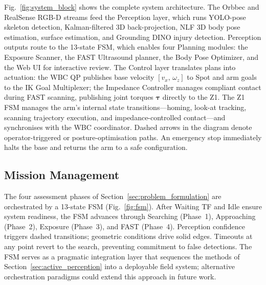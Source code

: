 Fig.~\ref{fig:system_block} shows the complete system architecture. The Orbbec
and RealSense RGB-D streams feed the Perception layer, which runs YOLO-pose
skeleton detection, Kalman-filtered 3D back-projection, NLF 3D body pose
estimation, surface estimation, and Grounding DINO injury detection. Perception
outputs route to the 13-state \ac{FSM}, which enables four Planning modules: the
Exposure Scanner, the \ac{FAST} Ultrasound planner, the Body Pose Optimizer, and
the Web UI for interactive review. The Control layer translates plans into
actuation: the \ac{WBC} \ac{QP} publishes base velocity $[v_x,\,\omega_z]$ to
Spot and arm goals to the \ac{IK} Goal Multiplexer; the Impedance Controller
manages compliant contact during \ac{FAST} scanning, publishing joint torques
$\boldsymbol{\tau}$ directly to the Z1. The Z1 \ac{FSM} manages the arm's
internal state transitions---homing, look-at tracking, scanning trajectory
execution, and impedance-controlled contact---and synchronises with the
\ac{WBC} coordinator. Dashed arrows in the diagram denote operator-triggered or
posture-optimisation paths. An emergency stop immediately halts the base and
returns the arm to a safe configuration.

\subsection{Mission Management}
The four assessment phases of Section~\ref{sec:problem_formulation} are
orchestrated by a 13-state \ac{FSM} (Fig.~\ref{fig:fsm}). After Waiting TF and
Idle ensure system readiness, the \ac{FSM} advances through Searching (Phase~1),
Approaching (Phase~2), Exposure (Phase~3), and \acs{FAST} (Phase~4).
Perception confidence triggers dashed transitions; geometric conditions drive
solid edges. Timeouts at any point revert to the search, preventing commitment
to false detections. The \ac{FSM} serves as a pragmatic integration layer that
sequences the methods of Section~\ref{sec:active_perception} into a deployable
field system; alternative orchestration paradigms could extend this approach in
future work.

